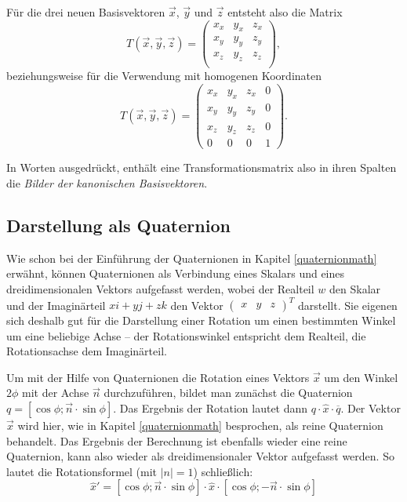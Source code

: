 Für die drei neuen Basisvektoren $\vec x$, $\vec y$ und $\vec z$ entsteht also die Matrix
\begin{equation}
 T(\vec x, \vec y, \vec z) =
 \begin{pmatrix}
  x_x & y_x & z_x \\
  x_y & y_y & z_y \\
  x_z & y_z & z_z \\
 \end{pmatrix},
\end{equation}
beziehungsweise für die Verwendung mit homogenen Koordinaten
\begin{equation}
 T(\vec x, \vec y, \vec z) =
 \begin{pmatrix}
  x_x & y_x & z_x & 0 \\
  x_y & y_y & z_y & 0 \\
  x_z & y_z & z_z & 0 \\
  0 & 0 & 0 & 1
 \end{pmatrix}.
\end{equation}

In Worten ausgedrückt, enthält eine Transformationsmatrix also in ihren Spalten die \emph{Bilder der kanonischen Basisvektoren}.

\subsection{Darstellung als Quaternion}
Wie schon bei der Einführung der Quaternionen in Kapitel \ref{quaternionmath} erwähnt, können Quaternionen als Verbindung eines Skalars und eines dreidimensionalen Vektors aufgefasst werden, wobei der Realteil $w$ den Skalar und der Imaginärteil $xi + yj + zk$ den Vektor $\begin{pmatrix}x & y & z\end{pmatrix}^T$ darstellt. Sie eigenen sich deshalb gut für die Darstellung einer Rotation um einen bestimmten Winkel um eine beliebige Achse -- der Rotationswinkel entspricht dem Realteil, die Rotationsachse dem Imaginärteil.

Um mit der Hilfe von Quaternionen die Rotation eines Vektors $\vec x$ um den Winkel $2 \phi$ mit der Achse $\vec n$ durchzuführen, bildet man zunächst die Quaternion $q = \left[ \cos \phi; \vec n \cdot \sin \phi \right]$. Das Ergebnis der Rotation lautet dann $q \cdot \hat{x} \cdot \overline{q}$. Der Vektor $\vec x$ wird hier, wie in Kapitel \ref{quaternionmath} besprochen, als reine Quaternion behandelt. Das Ergebnis der Berechnung ist ebenfalls wieder eine reine Quaternion, kann also wieder als dreidimensionaler Vektor aufgefasst werden. So lautet die Rotationsformel (mit $\left| n \right| = 1$) schließlich:
\begin{equation}
 \hat{x}' = \left[ \cos \phi; \vec n \cdot \sin \phi \right] \cdot \hat{x} \cdot \left[ \cos \phi; -\vec n \cdot \sin \phi \right]
\end{equation}

